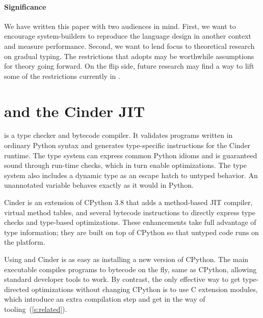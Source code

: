 \documentclass[a4paper,english,cleveref,autoref,thm-restate,anonymous,]{lipics-v2021}
\begin{document}
\paragraph*{Significance}

We have written this paper with two audiences in mind.
First, we want to encourage system-builders to reproduce the
\SP{} language design in another context and measure performance.
Second, we want to lend focus to theoretical research on gradual typing.
The restrictions that \SP{} adopts
may be worthwhile assumptions for theory going forward.
On the flip side, future research may find a way to lift some of
the restrictions currently in \SP{}.


\section{\SP{} and the Cinder JIT}
\label{s:tour}


\SP{} is a type checker and bytecode compiler.
It validates programs written in ordinary Python syntax
and generates type-specific instructions for the Cinder runtime.
The type system can express common Python idioms and is guaranteed
sound through run-time checks, which in turn enable optimizations.
The type system also includes a dynamic type as an escape hatch to
untyped behavior.
An unannotated variable behaves exactly as it would in Python.

Cinder is an extension of CPython 3.8 that adds a method-based
JIT compiler, virtual method tables, and several bytecode instructions
to directly express type checks and type-based optimizations.
These enhancements take full advantage of \SP{} type information;
they are built on top of CPython so that untyped code runs on
the platform.

Using \SP{} and Cinder is as easy as installing a new version
of CPython.
The main executable compiles programs to bytecode on the fly,
same as CPython, allowing standard developer tools to work.
By contrast, the only effective way to get type-directed optimizations
without changing CPython is to use C extension modules,
which introduce an extra compilation step and get in the way
of tooling~(\cref{s:related}).
\end{document}
